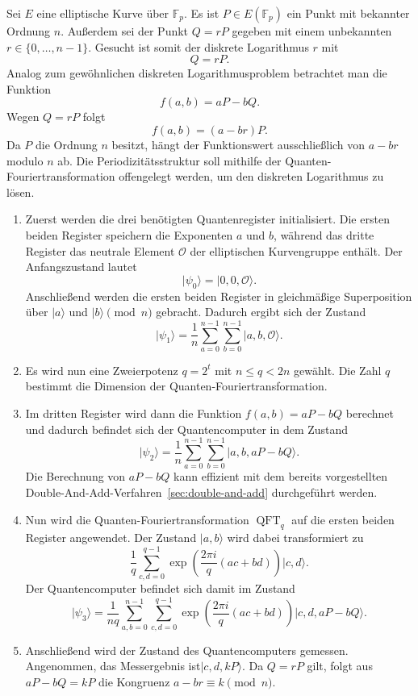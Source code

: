Sei $E$ eine elliptische Kurve über $\mathbb{F}_p$. Es ist $P\in E(\mathbb{F}_p)$ ein Punkt mit bekannter Ordnung $n$. Außerdem sei der Punkt $Q=rP$ gegeben mit einem unbekannten $r\in\{0,\ldots ,n-1\}$. Gesucht ist somit der diskrete Logarithmus $r$
mit
\[
    Q=rP.
\]
Analog zum gewöhnlichen diskreten Logarithmusproblem betrachtet man die Funktion
\[
    f(a,b)=aP-bQ.
\]
Wegen $Q=rP$ folgt
\[
    f(a,b)=(a-br)P.
\]
Da $P$ die Ordnung $n$ besitzt, hängt der Funktionswert ausschließlich von $a-br$ modulo $n$ ab. Die Periodizitätsstruktur soll mithilfe der Quanten-Fouriertransformation offengelegt werden, um den diskreten Logarithmus zu lösen.
\begin{enumerate}
    \item Zuerst werden die drei benötigten Quantenregister initialisiert. Die ersten beiden Register speichern die Exponenten $a$ und $b$, während das dritte Register das neutrale Element $\mathcal O$ der elliptischen Kurvengruppe enthält. Der Anfangszustand lautet
    \[
    \lvert\psi_0\rangle=\lvert0,0,\mathcal{O}\rangle.
    \]
    Anschließend werden die ersten beiden Register in gleichmäßige Superposition über $\lvert a\rangle$ und $\lvert b\rangle\pmod n$ gebracht. Dadurch ergibt sich der Zustand
    \[
    \lvert\psi_1\rangle=\frac{1}{n}\sum_{a=0}^{n-1}\sum_{b=0}^{n-1}\lvert a,b,\mathcal{O}\rangle.
    \]
    \item Es wird nun eine Zweierpotenz $q=2^t$ mit \(n\leq q<2n\) gewählt. Die Zahl $q$ bestimmt die Dimension der Quanten-Fouriertransformation.
    \item Im dritten Register wird dann die Funktion $f(a,b)=aP-bQ$ berechnet und dadurch befindet sich der Quantencomputer in dem Zustand
    \[
    \lvert\psi_2\rangle=\frac{1}{n}\sum_{a=0}^{n-1}\sum_{b=0}^{n-1}\lvert a,b,aP-bQ\rangle.
    \]
    Die Berechnung von $aP-bQ$ kann effizient mit dem bereits vorgestellten Double-And-Add-Verfahren~\ref{sec:double-and-add} durchgeführt werden.
    \item Nun wird die Quanten-Fouriertransformation \(\operatorname{QFT}_q\) auf die ersten beiden Register angewendet. Der Zustand $|a,b\rangle$ wird dabei transformiert zu
    \[
    \frac{1}{q}
    \sum_{c,d=0}^{q-1}
    \exp\left(
    \frac{2\pi i}{q}(ac+bd)
    \right)|c,d\rangle.
    \]
    Der Quantencomputer befindet sich damit im Zustand 
    \[
    \lvert\psi_3\rangle=\frac{1}{nq}\sum_{a,b=0}^{n-1}\sum_{c,d=0}^{q-1}\exp\left(\frac{2\pi i}{q}(ac+bd)\right)\lvert c,d,aP-bQ\rangle.
    \]
    \item Anschließend wird der Zustand des Quantencomputers gemessen. Angenommen, das Messergebnis ist\(\lvert c,d,kP\rangle\). Da $Q=rP$ gilt, folgt aus \(aP-bQ=kP\) die Kongruenz \(a-br\equiv k\pmod n\).

\end{enumerate}
